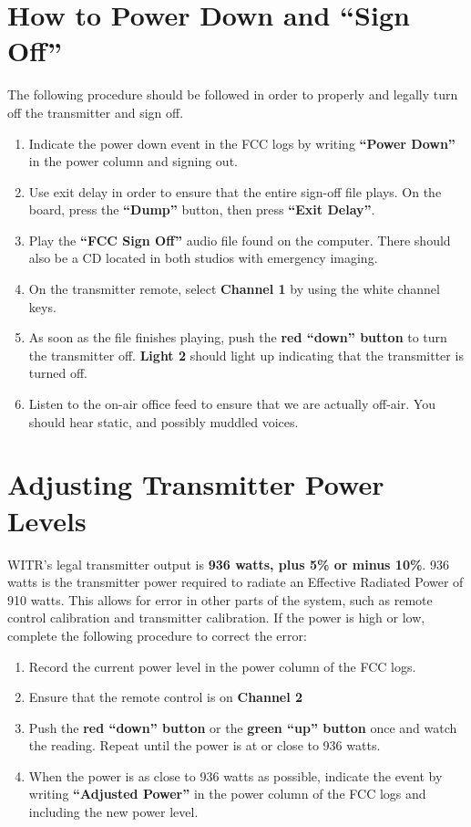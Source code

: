 \documentclass{witrman}
\begin{document}
\section{How to Power Down and ``Sign Off''}
The following procedure should be followed in order to properly and legally turn
off the transmitter and sign off.
\begin{enumerate}
    \item Indicate the power down event in the FCC logs by writing
        \textbf{``Power Down''} in the power column and signing out.
    \item Use exit delay in order to ensure that the entire sign-off file plays.
        On the board, press the \textbf{``Dump''} button, then press
        \textbf{``Exit Delay''}.
    \item Play the \textbf{``FCC Sign Off''} audio file found on the computer.
        There should also be a CD located in both studios with emergency
        imaging.
    \item On the transmitter remote, select \textbf{Channel 1} by using the
        white channel keys.
    \item As soon as the file finishes playing, push the \textbf{red ``down''
        button} to turn the transmitter off. \textbf{Light 2} should light up
        indicating that the transmitter is turned off.
    \item Listen to the on-air office feed to ensure that we are actually
        off-air. You should hear static, and possibly muddled voices.
\end{enumerate}

\section{Adjusting Transmitter Power Levels}
WITR’s legal transmitter output is \textbf{936 watts, plus 5\% or minus 10\%}.
936 watts is the transmitter power required to radiate an Effective Radiated
Power of 910 watts. This allows for error in other parts of the system, such as
remote control calibration and transmitter calibration. If the power is high or
low, complete the following procedure to correct the error:
\begin{enumerate}
    \item Record the current power level in the power column of the FCC logs.
    \item Ensure that the remote control is on \textbf{Channel 2}
    \item Push the \textbf{red ``down'' button} or the \textbf{green ``up''
        button} once and watch the reading. Repeat until the power is at or
        close to 936 watts.
    \item When the power is as close to 936 watts as possible, indicate the
        event by writing \textbf{``Adjusted Power''} in the power column of the
        FCC logs and including the new power level.
\end{enumerate}
\end{document}
